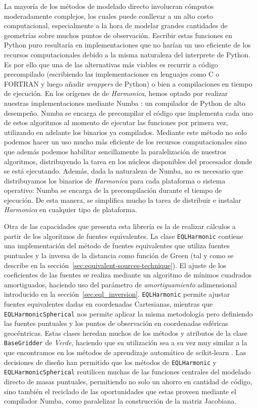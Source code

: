 La mayoría de los métodos de modelado directo involucran cómputos moderadamente
complejos, los cuales puede conllevar a un alto costo computacional,
especialmente a la hora de modelar grandes cantidades de geometrías sobre
muchos puntos de observación.
Escribir estas funciones en Python puro resultaría en implementaciones que no
harían un uso eficiente de los recursos computacionales debido a la misma
naturaleza del interprete de Python.
Es por ello que una de las alternativas más viables es recurrir a código
precompilado (escribiendo las implementaciones en lenguajes como C o FORTRAN
y luego añadir \emph{wrappers} de Python) o bien a compilaciones en tiempo de
ejecución.
En los orígenes de de \emph{Harmonica}, hemos optado por realizar nuestras
implementaciones mediante Numba \citep{numba2015}: un compilador de Python de
alto desempeño.
Numba se encarga de precompilar el código que implementa cada uno de estos
algoritmos al momento de ejecutar las funciones por primera vez, utilizando en
adelante los binarios ya compilados.
Mediante este método no solo podemos hacer un uso mucho más eficiente de los
recursos computacionales sino que además podemos habilitar sencillamente la
paralelización de nuestros algoritmos, distribuyendo la tarea en los
núcleos disponibles del procesador donde se está ejecutando.
Además, dada la naturaleza de Numba, no es necesario que distribuyamos los
binarios de \emph{Harmonica} para cada plataforma o sistema operativo: Numba se
encarga de la precompilación durante el tiempo de ejecución.
De esta manera, se simplifica mucho la tarea de distribuir e instalar
\emph{Harmonica} en cualquier tipo de plataforma.

Otra de las capacidades que presenta esta librería es la de realizar cálculos
a partir de los algoritmos de fuentes equivalentes.
La clase \texttt{EQLHarmonic} contiene una implementación del método de fuentes
equivalentes que utiliza fuentes puntuales y la inversa de la distancia como
función de Green (tal y como se describe en la
sección~\ref{sec:equivalent-sources-technique}).
El ajuste de los coeficientes de las fuentes se realiza mediante un algoritmo
de mínimos cuadrados amortiguados, haciendo uso del parámetro de
\emph{amortiguamiento} adimensional introducido en la
sección~\ref{sec:eql_inversion}.
\texttt{EQLHarmonic} permite ajustar fuentes equivalentes dadas en coordenadas
Cartesianas, mientras que \texttt{EQLHarmonicSpherical} nos permite aplicar la
misma metodología pero definiendo las fuentes puntuales y los puntos de
observación en coordenadas esféricas geocéntricas.
Estas clases heredan muchos de los métodos y atributos de la clase
\texttt{BaseGridder} de \emph{Verde}, haciendo que su utilización sea a su vez
muy similar a la que encontramos en los métodos de aprendizaje automático de
scikit-learn \citep{sklearn2011}.
Las decisiones de diseño han permitido que los métodos de \texttt{EQLHarmonic}
y \texttt{EQLHarmonicSpherical} reutilicen muchas de las funciones centrales
del modelado directo de masas puntuales, permitiendo no solo un ahorro en
cantidad de código, sino también el reciclado de las oportunidades que estas
proveen mediante el compilador Numba, como paralelizar la construcción de la
matriz Jacobiana.

